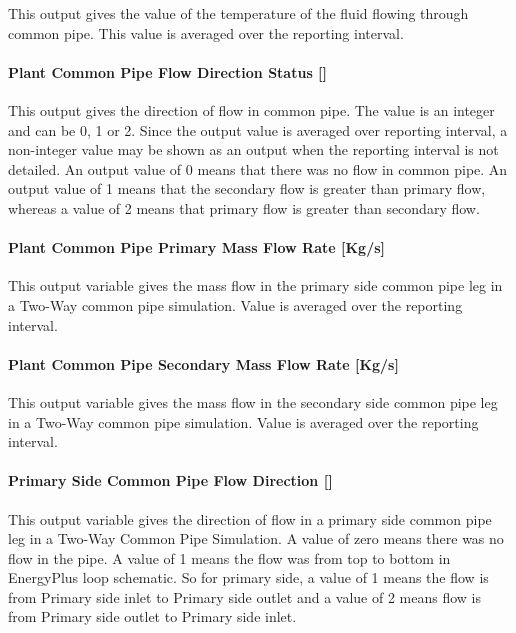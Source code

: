 This output gives the value of the temperature of the fluid flowing through common pipe. This value is averaged over the reporting interval.

\paragraph{\texorpdfstring{Plant Common Pipe Flow Direction Status {[]}}{Plant Common Pipe Flow Direction Status }}\label{plant-common-pipe-flow-direction-status}

This output gives the direction of flow in common pipe. The value is an integer and can be 0, 1 or 2. Since the output value is averaged over reporting interval, a non-integer value may be shown as an output when the reporting interval is not detailed. An output value of 0 means that there was no flow in common pipe. An output value of 1 means that the secondary flow is greater than primary flow, whereas a value of 2 means that primary flow is greater than secondary flow.

\paragraph{Plant Common Pipe Primary Mass Flow Rate {[}Kg/s{]}}\label{plant-common-pipe-primary-mass-flow-rate-kgs}

This output variable gives the mass flow in the primary side common pipe leg in a Two-Way common pipe simulation. Value is averaged over the reporting interval.

\paragraph{Plant Common Pipe Secondary Mass Flow Rate {[}Kg/s{]}}\label{plant-common-pipe-secondary-mass-flow-rate-kgs}

This output variable gives the mass flow in the secondary side common pipe leg in a Two-Way common pipe simulation. Value is averaged over the reporting interval.

\paragraph{\texorpdfstring{Primary Side Common Pipe Flow Direction {[]}}{Primary Side Common Pipe Flow Direction }}\label{primary-side-common-pipe-flow-direction}

This output variable gives the direction of flow in a primary side common pipe leg in a Two-Way Common Pipe Simulation. A value of zero means there was no flow in the pipe. A value of 1 means the flow was from top to bottom in EnergyPlus loop schematic. So for primary side, a value of 1 means the flow is from Primary side inlet to Primary side outlet and a value of 2 means flow is from Primary side outlet to Primary side inlet.

